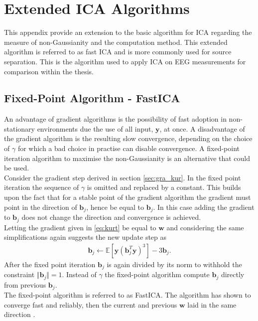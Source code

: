 \chapter{Extended ICA Algorithms}\label{app:ICA}





This appendix provide an extension to the basic algorithm for ICA regarding the measure of non-Gaussianity and the computation method. This extended algorithm is referred to as fast ICA and is more commonly used for source separation. This is the algorithm used to apply ICA on EEG measurements for comparison within the thesis.        

\section{Fixed-Point Algorithm - FastICA}
An advantage of gradient algorithms is the possibility of fast adoption in non-stationary environments due the use of all input, $\textbf{y}$, at once. A disadvantage of the gradient algorithm is the resulting slow convergence, depending on the choice of $\gamma$ for which a bad choice in practise can disable convergence. A fixed-point iteration algorithm to maximise the non-Gaussianity is an alternative that could be used.\\
Consider the gradient step derived in section \ref{sec:gra_kur}.
In the fixed point iteration the sequence of $\gamma$ is omitted and replaced by a constant. This builds upon the fact that for a stable point of the gradient algorithm the gradient must point in the direction of $\textbf{b}_j$, hence be equal to $\textbf{b}_j$. In this case adding the gradient to $\textbf{b}_j$ does not change the direction and convergence is achieved.\\    
Letting the gradient given in \eqref{eq:kurt} be equal to $\mathbf{w}$ and  considering the same simplifications again
suggests the new update step as \cite[p. 179]{ICA}
\begin{align*}
\mathbf{b}_j \gets \mathbb{E}[\mathbf{y}(\textbf{b}_{j}^T \textbf{y})^3] - 3 \mathbf{b}_j.
\end{align*}
After the fixed point iteration $\textbf{b}_j$ is again divided by its norm to withhold the constraint $\Vert \textbf{b}_j \Vert = 1$.   
Instead of $\gamma$ the fixed-point algorithm compute $\mathbf{b}_j$ directly from previous $\mathbf{b}_j$.\\
The fixed-point algorithm is referred to as FastICA. The algorithm has shown to converge fast and reliably, then the current and previous $\mathbf{w}$ laid in the same direction \cite[p. 179]{ICA}. 

